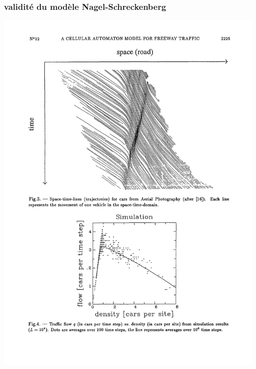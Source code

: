 \documentclass[slidetop,11pt]{beamer}
\begin{document}
\begin{frame}
\frametitle{validité du modèle Nagel-Schreckenberg}
\includegraphics[scale = 0.7]{./images/dfondcomp}

\end{frame}
\end{document}
